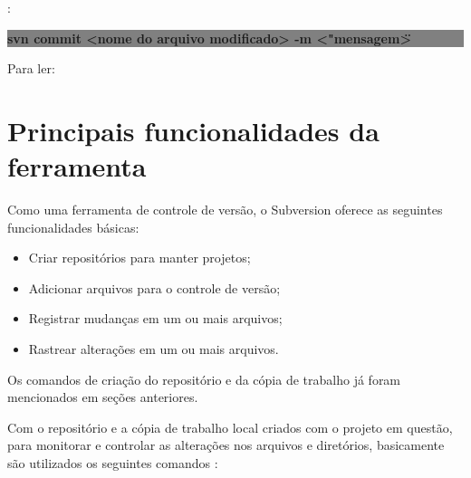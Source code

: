 \begin{multicols}{2}


:{

\colorbox{Gray}{
\begin{minipage}{210px}
  \textbf{svn commit <nome do arquivo modificado> -m <"mensagem\">}
\end{minipage}
}
}

Para ler:

\colorbox{Gray}{
\begin{minipage}{100px}
\end{minipage}
}

\end{multicols}

\section{Principais funcionalidades da ferramenta}

Como uma ferramenta de controle de versão, o Subversion oferece as seguintes funcionalidades básicas:

\begin{itemize}
 \item Criar repositórios para manter projetos;
 \item Adicionar arquivos para o controle de versão; 
 \item Registrar mudanças em um ou mais arquivos;
 \item Rastrear alterações em um ou mais arquivos.
\end{itemize}

Os comandos de criação do repositório e da cópia de trabalho já foram mencionados em seções anteriores.

Com o repositório e a cópia de trabalho local criados com o projeto em questão, para monitorar e controlar as
alterações nos arquivos e diretórios, basicamente são utilizados os seguintes comandos \cite{svn-book}:

